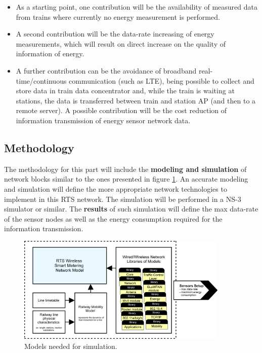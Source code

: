 \begin{itemize}
	\setlength\itemsep{0em}
	
	\item As a starting point, one contribution will be the availability of measured data from trains where currently no energy measurement is performed.
	
	\item A second contribution will be the data-rate increasing of energy measurements, which will result on direct increase on the quality of information of energy.
	
	\item A further contribution can be the avoidance of broadband real-time/continuous communication (such as LTE), being possible to collect and store data in train data concentrator and, while the train is waiting at stations, the data is transferred between train and station AP (and then to a remote server). A possible contribution will be the cost reduction of information transmission of energy sensor network data.
\end{itemize}

\subsection{Methodology}

The methodology for this part will include the \textbf{modeling and simulation} of network blocks similar to the ones presented in figure \ref{fig:4.methodWireless}. An accurate modeling and simulation will define the more appropriate network technologies to implement in this RTS network. 
The simulation will be performed in a NS-3 simulator or similar.
The \textbf{results} of such simulation will define the max data-rate of the sensor nodes as well as the energy consumption required for the information transmission.

\begin{figure}[h!]
	\centering
	\includegraphics[width=0.9\textwidth,keepaspectratio]{figures/4.Method/methodWireless}
	\caption{Models needed for simulation.}
	\label{fig:4.methodWireless}
\end{figure}

